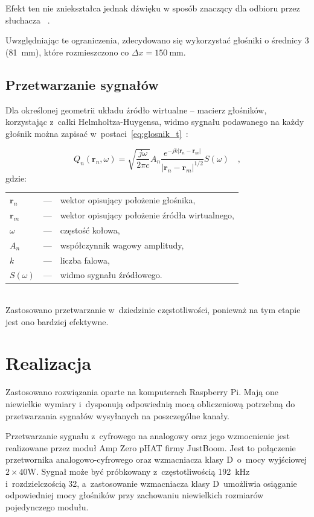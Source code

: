 \documentclass[10pt, a4paper]{article}
\let\Oldsection\section
\renewcommand{\section}{\FloatBarrier\Oldsection}
\let\Oldsubsection\subsection
\renewcommand{\subsection}{\FloatBarrier\Oldsubsection}
\begin{document}
\noindent Efekt ten nie zniekształca jednak dźwięku w sposób znaczący dla odbioru przez słuchacza
~\cite{hq_rendering}.

Uwzględniając te ograniczenia, zdecydowano się wykorzystać głośniki o średnicy \SI{3}{\inch}
(\SI{81}{\milli\meter}), które rozmieszczono co $\Delta x=\SI{150}{\milli\meter}$.

\subsection{Przetwarzanie sygnałów}\label{s:algorithm}

Dla określonej geometrii układu źródło wirtualne -- macierz głośników,
korzystając z~całki Helmholtza-Huygensa, widmo sygnału podawanego na każdy głośnik można zapisać
w~postaci~\eqref{eq:glosnik_t}~\cite{enhancement}:

\begin{equation}
Q_n(\bm{r}_n,\omega) = \sqrt{\frac{j\omega}{2\pi c}} A_n \frac {e^{-jk|\bm{r}_n-\bm{r}_m|}}{|\bm{r}_n-\bm{r}_m|^{1/2}} S(\omega) \quad,
\label{eq:glosnik_f}
\end{equation}
gdzie:\\
    \indent \begin{tabular}{l c p{}}
        $\bm{r}_n$ & --- & wektor opisujący położenie głośnika, \\
        $\bm{r}_m$ & --- & wektor opisujący położenie źródła wirtualnego,\\
        $\omega$ & --- & częstość kołowa, \\
        $A_n$ & --- & współczynnik wagowy amplitudy,\\
        $k$ & --- & liczba falowa,\\
        $S(\omega)$ & --- & widmo sygnału źródłowego.
    \end{tabular}\\
        
Zastosowano przetwarzanie w~dziedzinie częstotliwości, ponieważ na tym etapie jest ono bardziej efektywne.

\section{Realizacja}

Zastosowano rozwiązania oparte na komputerach Raspberry
Pi. Mają one niewielkie wymiary i~dysponują odpowiednią mocą obliczeniową
potrzebną do przetwarzania sygnałów wysyłanych na poszczególne kanały.

Przetwarzanie sygnału z~cyfrowego na analogowy oraz jego wzmocnienie jest
realizowane przez moduł Amp Zero pHAT firmy JustBoom. Jest to połączenie
przetwornika analogowo-cyfrowego oraz wzmacniacza klasy D~o~mocy wyjściowej
$2\times40\si{\watt}$. Sygnał może być próbkowany z~częstotliwością
\SI{192}{\kilo\hertz} i~rozdzielczością \SI{32}{\bit}, a~zastosowanie
wzmacniacza klasy D~umożliwia osiąganie odpowiedniej mocy głośników przy
zachowaniu niewielkich rozmiarów pojedynczego modułu.
\end{document}
